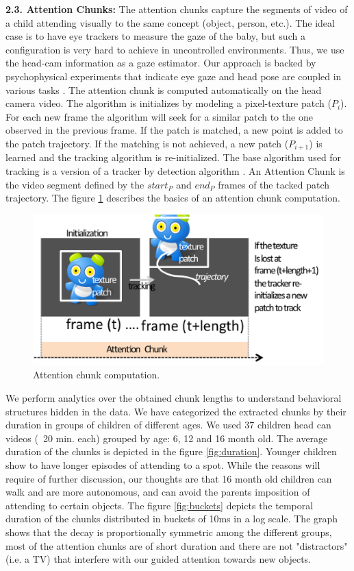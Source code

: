 \documentclass[10pt,letterpaper]{article}
\begin{document}
{\bf 2.3. Attention Chunks:} 
The attention chunks capture the segments of video of a child attending visually to the same concept (object, person, etc.). The ideal case is to have eye trackers to measure the gaze of the baby, but such a configuration is very hard to achieve in uncontrolled environments. Thus, we use the head-cam information as a gaze estimator. Our approach is backed by psychophysical experiments that indicate eye gaze and head pose are coupled in various tasks \cite{Land1,Pelz}. The attention chunk is computed automatically on the head camera video. The algorithm is initializes by modeling a pixel-texture patch ($P_{i}$). 
For each new frame the algorithm will seek for a similar patch to the one observed in the previous frame. If the patch is matched, a new point is added to the patch trajectory. If the matching is not achieved, a new patch ($P_{i+1}$) is learned and the tracking algorithm is re-initialized. The base algorithm used for tracking is a version of a tracker by detection algorithm \cite{kalal}. An Attention Chunk is the video segment defined by the $start_{P}$ and $end_{P}$ frames of the tacked patch trajectory.
The figure \ref{fig:chunk} describes the basics of an attention chunk computation.\\
\begin{figure}[h]
\begin{center}
        \includegraphics[width=0.8\linewidth]{Image/Attchunk} 
        
          \end{center}
    \caption{Attention chunk computation.}
   \label{fig:chunk}
\end{figure}

We perform analytics over the obtained chunk lengths to understand behavioral structures hidden in the data. We have categorized the extracted chunks by their duration in groups of children of different ages. We used 37 children head can videos (~20 min. each) grouped by age: 6, 12 and 16 month old. The average duration of the chunks is depicted in the figure \ref{fig:duration}. Younger children show to have longer episodes of attending to a spot. While the reasons will require of further discussion, our thoughts are that 16 month old children can walk and are more autonomous, and can avoid the parents imposition of attending to certain objects. The figure \ref{fig:buckets} depicts the temporal duration of the chunks distributed in buckets of 10ms in a log scale. The graph shows that the decay is proportionally symmetric among the different groups, most of the attention chunks are of short duration and there are not "distractors" (i.e. a TV) that interfere with our guided attention towards new objects. 
\end{document}
